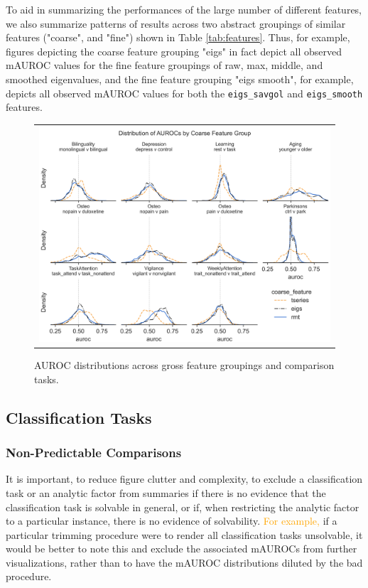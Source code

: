 \documentclass[12pt]{spieman}  %
\newcommand{\code}[1]{\small\texttt{#1}\normalsize}
\begin{document}
\begin{spacing}{2}
To aid in summarizing the performances of the large number of different
features, we also summarize patterns of results across two abstract groupings
of similar features ("coarse", and "fine") shown in Table \ref{tab:features}.
Thus, for example, figures depicting the coarse feature grouping "eigs" in fact
depict all observed mAUROC values for the fine feature groupings of raw,
max, middle, and smoothed eigenvalues, and the fine feature grouping "eigs
smooth", for example, depicts all observed mAUROC values for both the
\code{eigs\_savgol} and \code{eigs\_smooth} features.


\begin{figure}
\begin{center}
\begin{tabular}{c}
\includegraphics[width=6.5in]{coarse_feature_overall_by_subgroup.png}
\end{tabular}
\end{center}
\caption
{ \label{fig:main-results}
AUROC distributions across gross feature groupings and comparison tasks.}
\end{figure}

\subsection{Classification Tasks}

\subsubsection{Non-Predictable Comparisons}

It is important, to reduce figure clutter and complexity, to exclude a
classification task or an analytic factor from summaries if there is no
evidence that the classification task is solvable in general, or if, when
restricting the analytic factor to a particular instance, there is no evidence
of solvability. \textcolor{orange}{For example,} if a particular trimming
procedure were to render all classification tasks unsolvable, it would be
better to note this and exclude the associated mAUROCs from further
visualizations, rather than to have the mAUROC distributions diluted by the bad
procedure.


\end{spacing}
\end{document}
